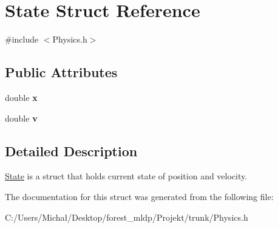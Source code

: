 \hypertarget{struct_state}{}\section{State Struct Reference}
\label{struct_state}


{\ttfamily \#include $<$Physics.\+h$>$}

\subsection*{Public Attributes}
\begin{DoxyCompactItemize}
\item 
double {\bfseries x}\hypertarget{struct_state_a1d6752ab6463a0b1ec35de1e5a92d8a1}{}\label{struct_state_a1d6752ab6463a0b1ec35de1e5a92d8a1}

\item 
double {\bfseries v}\hypertarget{struct_state_a367b8510c069824d4ebfcac3dc7a15db}{}\label{struct_state_a367b8510c069824d4ebfcac3dc7a15db}

\end{DoxyCompactItemize}


\subsection{Detailed Description}
\hyperlink{struct_state}{State} is a struct that holds current state of position and velocity. 

The documentation for this struct was generated from the following file\+:\begin{DoxyCompactItemize}
\item 
C\+:/\+Users/\+Michał/\+Desktop/forest\+\_\+mldp/\+Projekt/trunk/Physics.\+h\end{DoxyCompactItemize}
